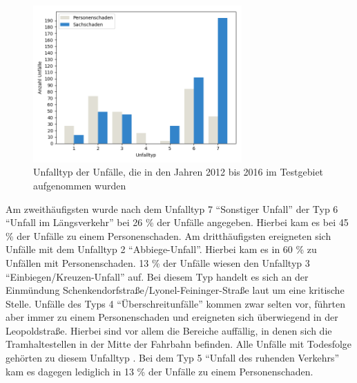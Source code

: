 \begin{savenotes}
	\begin{figure}[H]
		\centering
		\includegraphics[width=8cm,height=6cm]{figures/Unfalltyp}
		\caption[Unfalltyp der Unfälle, die in den Jahren 2012 bis 2016 im Testgebiet aufgenommen wurden]{Unfalltyp der Unfälle, die in den Jahren 2012 bis 2016 im Testgebiet aufgenommen wurden}\label{fig:Unfalltyp}
	\end{figure}
\end{savenotes}

Am zweithäufigsten wurde nach dem Unfalltyp 7 \enquote{Sonstiger Unfall} der Typ 6 \enquote{Unfall im Längsverkehr} bei 26 \% der Unfälle angegeben. Hierbei kam es bei 45 \% der Unfälle zu einem Personenschaden. Am dritthäufigsten ereigneten sich Unfälle mit dem Unfalltyp 2 \enquote{Abbiege-Unfall}. Hierbei kam es in 60 \% zu Unfällen mit Personenschaden. 13 \% der Unfälle wiesen den Unfalltyp 3 \enquote{Einbiegen/Kreuzen-Unfall} auf. Bei diesem Typ handelt es sich an der Einmündung Schenkendorfstraße/Lyonel-Feininger-Straße laut \Textcite[S. 23]{Bruhn.2018} um eine kritische Stelle. Unfälle des Typs 4 \enquote{Überschreitunfälle} kommen zwar selten vor, führten aber immer zu einem Personenschaden und ereigneten sich überwiegend in der Leopoldstraße. Hierbei sind vor allem die Bereiche auffällig, in denen sich die Tramhaltestellen in der Mitte der Fahrbahn befinden. Alle Unfälle mit Todesfolge gehörten zu diesem Unfalltyp \parencite[S. 26f]{Bruhn.2018}. Bei dem Typ 5 \enquote{Unfall des ruhenden Verkehrs} kam es dagegen lediglich in 13 \% der Unfälle zu einem Personenschaden.

